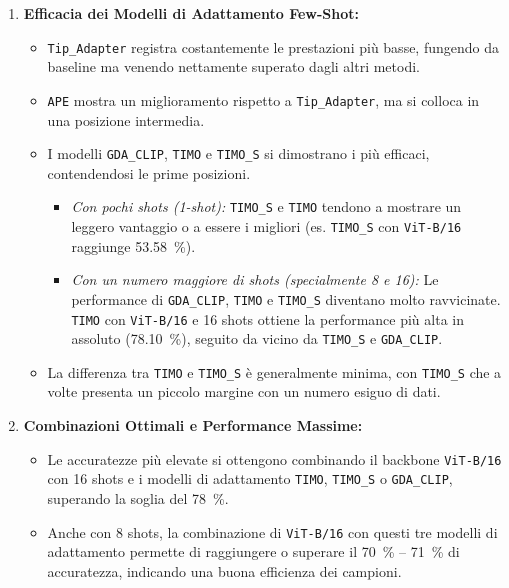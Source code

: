 \documentclass[11pt,a4paper]{article}
\begin{document}
\begin{enumerate}
    \item \textbf{Efficacia dei Modelli di Adattamento Few-Shot:}
    \begin{itemize}[label=\textbullet, leftmargin=*]
        \item \texttt{Tip\_Adapter} registra costantemente le prestazioni più basse, fungendo da baseline ma venendo nettamente superato dagli altri metodi.
        \item \texttt{APE} mostra un miglioramento rispetto a \texttt{Tip\_Adapter}, ma si colloca in una posizione intermedia.
        \item I modelli \texttt{GDA\_CLIP}, \texttt{TIMO} e \texttt{TIMO\_S} si dimostrano i più efficaci, contendendosi le prime posizioni.
            \begin{itemize}[label=\textendash, leftmargin=*]
                \item \textit{Con pochi shots (1-shot):} \texttt{TIMO\_S} e \texttt{TIMO} tendono a mostrare un leggero vantaggio o a essere i migliori (es. \texttt{TIMO\_S} con \texttt{ViT-B/16} raggiunge \SI{53.58}{\percent}).
                \item \textit{Con un numero maggiore di shots (specialmente 8 e 16):} Le performance di \texttt{GDA\_CLIP}, \texttt{TIMO} e \texttt{TIMO\_S} diventano molto ravvicinate. \texttt{TIMO} con \texttt{ViT-B/16} e 16 shots ottiene la performance più alta in assoluto (\SI{78.10}{\percent}), seguito da vicino da \texttt{TIMO\_S} e \texttt{GDA\_CLIP}.
            \end{itemize}
        \item La differenza tra \texttt{TIMO} e \texttt{TIMO\_S} è generalmente minima, con \texttt{TIMO\_S} che a volte presenta un piccolo margine con un numero esiguo di dati.
    \end{itemize}

    \item \textbf{Combinazioni Ottimali e Performance Massime:}
    \begin{itemize}[label=\textbullet, leftmargin=*]
        \item Le accuratezze più elevate si ottengono combinando il backbone \texttt{ViT-B/16} con 16 shots e i modelli di adattamento \texttt{TIMO}, \texttt{TIMO\_S} o \texttt{GDA\_CLIP}, superando la soglia del \SI{78}{\percent}.
        \item Anche con 8 shots, la combinazione di \texttt{ViT-B/16} con questi tre modelli di adattamento permette di raggiungere o superare il \SI{70}{\percent} -- \SI{71}{\percent} di accuratezza, indicando una buona efficienza dei campioni.
    \end{itemize}


\end{enumerate}
\end{document}
